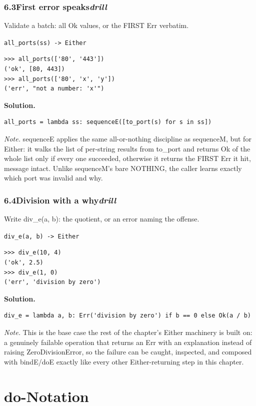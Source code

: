 \documentclass[10pt,letterpaper]{book}
\begin{document}
\subsection*{6.3\quad First error speaks\hfill\textnormal{\textit{drill}}}
Validate a batch: all Ok values, or the FIRST Err verbatim.

\noindent\texttt{all\_ports(ss) -> Either}
\begin{lstlisting}[style=ex]
>>> all_ports(['80', '443'])
('ok', [80, 443])
>>> all_ports(['80', 'x', 'y'])
('err', "not a number: 'x'")
\end{lstlisting}
\noindent\textbf{Solution.}
\begin{lstlisting}[style=code]
all_ports = lambda ss: sequenceE([to_port(s) for s in ss])
\end{lstlisting}
\noindent\textit{Note.} sequenceE applies the same all-or-nothing discipline as sequenceM, but for Either: it walks the list of per-string results from to\_port and returns Ok of the whole list only if every one succeeded, otherwise it returns the FIRST Err it hit, message intact. Unlike sequenceM's bare NOTHING, the caller learns exactly which port was invalid and why.

\subsection*{6.4\quad Division with a why\hfill\textnormal{\textit{drill}}}
Write div\_e(a, b): the quotient, or an error naming the offense.

\noindent\texttt{div\_e(a, b) -> Either}
\begin{lstlisting}[style=ex]
>>> div_e(10, 4)
('ok', 2.5)
>>> div_e(1, 0)
('err', 'division by zero')
\end{lstlisting}
\noindent\textbf{Solution.}
\begin{lstlisting}[style=code]
div_e = lambda a, b: Err('division by zero') if b == 0 else Ok(a / b)
\end{lstlisting}
\noindent\textit{Note.} This is the base case the rest of the chapter's Either machinery is built on: a genuinely failable operation that returns an Err with an explanation instead of raising ZeroDivisionError, so the failure can be caught, inspected, and composed with bindE/doE exactly like every other Either-returning step in this chapter.

\clearpage
\chapter{do-Notation}
\end{document}
